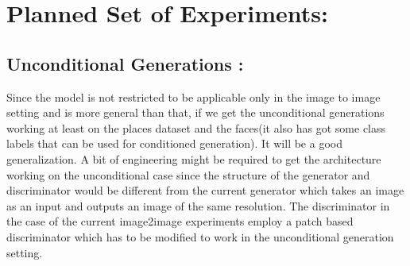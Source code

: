 \documentclass[10pt,twocolumn,letterpaper]{article}
\begin{document}
\section{Planned Set of Experiments:}
\subsection{Unconditional Generations :}
Since the model is not restricted to be applicable only in the image to image setting and is more general than that, if we get the unconditional generations working at least on the places dataset and the faces(it also has got some class labels that can be used for conditioned generation). It will be a good generalization. A bit of engineering might be required to get the architecture working on the unconditional case since the structure of the generator and discriminator would be different from the current generator which takes an image as an input and outputs an image of the same resolution. The discriminator in the case of the current image2image experiments employ a patch based discriminator which has to be modified to work in the unconditional generation setting.







\end{document}
